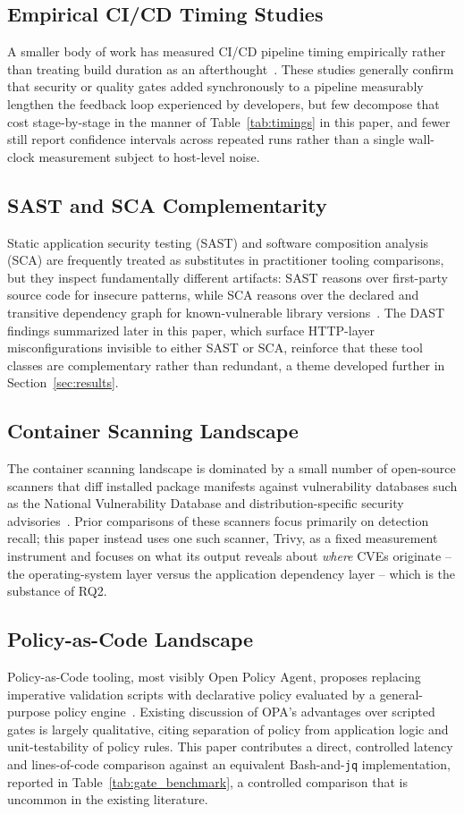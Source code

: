 \documentclass[conference]{IEEEtran}
\begin{document}
\subsection{Empirical CI/CD Timing Studies}
A smaller body of work has measured CI/CD pipeline timing empirically rather than treating build duration as an afterthought~\cite{ref2,ref3}. These studies generally confirm that security or quality gates added synchronously to a pipeline measurably lengthen the feedback loop experienced by developers, but few decompose that cost stage-by-stage in the manner of Table~\ref{tab:timings} in this paper, and fewer still report confidence intervals across repeated runs rather than a single wall-clock measurement subject to host-level noise.

\subsection{SAST and SCA Complementarity}
Static application security testing (SAST) and software composition analysis (SCA) are frequently treated as substitutes in practitioner tooling comparisons, but they inspect fundamentally different artifacts: SAST reasons over first-party source code for insecure patterns, while SCA reasons over the declared and transitive dependency graph for known-vulnerable library versions~\cite{ref4,ref10}. The DAST findings summarized later in this paper, which surface HTTP-layer misconfigurations invisible to either SAST or SCA, reinforce that these tool classes are complementary rather than redundant, a theme developed further in Section~\ref{sec:results}.

\subsection{Container Scanning Landscape}
The container scanning landscape is dominated by a small number of open-source scanners that diff installed package manifests against vulnerability databases such as the National Vulnerability Database and distribution-specific security advisories~\cite{ref5,ref9}. Prior comparisons of these scanners focus primarily on detection recall; this paper instead uses one such scanner, Trivy, as a fixed measurement instrument and focuses on what its output reveals about \emph{where} CVEs originate -- the operating-system layer versus the application dependency layer -- which is the substance of RQ2.

\subsection{Policy-as-Code Landscape}
Policy-as-Code tooling, most visibly Open Policy Agent, proposes replacing imperative validation scripts with declarative policy evaluated by a general-purpose policy engine~\cite{ref6}. Existing discussion of OPA's advantages over scripted gates is largely qualitative, citing separation of policy from application logic and unit-testability of policy rules. This paper contributes a direct, controlled latency and lines-of-code comparison against an equivalent Bash-and-\texttt{jq} implementation, reported in Table~\ref{tab:gate_benchmark}, a controlled comparison that is uncommon in the existing literature.
\end{document}
